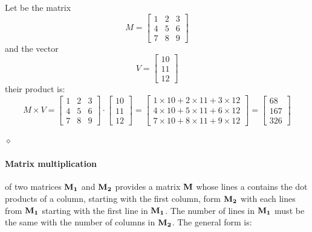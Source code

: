 \begin{exemplu}
Let be the matrix
\[
M = \begin{bmatrix}
    1 & 2 & 3 \\
    4 & 5 & 6\\
    7 & 8 & 9
    \end{bmatrix}
\]
and the vector 
\[
V = \begin{bmatrix}
    10 \\
    11 \\
    12 
    \end{bmatrix}
\] 
their product is:
\[
M \times V = \begin{bmatrix}
    1 & 2 & 3 \\
    4 & 5 & 6\\
    7 & 8 & 9
    \end{bmatrix}
    \cdot
    \begin{bmatrix}
    10 \\
    11 \\
    12
    \end{bmatrix}
    = 
    \begin{bmatrix}
    1 \times 10 + 2 \times 11 + 3 \times 12 \\
    4 \times 10 + 5 \times 11 + 6 \times 12  \\
    7 \times 10 + 8 \times 11 + 9 \times 12 
    \end{bmatrix}
    = 
     \begin{bmatrix}
    68 \\
    167 \\
    326
    \end{bmatrix}
\]

$\diamond$
\end{exemplu}

\paragraph{Matrix multiplication} of two matrices ${\bf M_1}$ and ${\bf M_2}$ provides a matrix ${\bf M}$ whose lines a contains the dot products of a column, starting with the first column, form ${\bf M_2}$ with each lines from ${\bf M_1}$ starting with the first line in ${\bf M_1}$. The number of lines in ${\bf M_1}$ must be the same with the number of columns in ${\bf M_2}$. The general form is:

